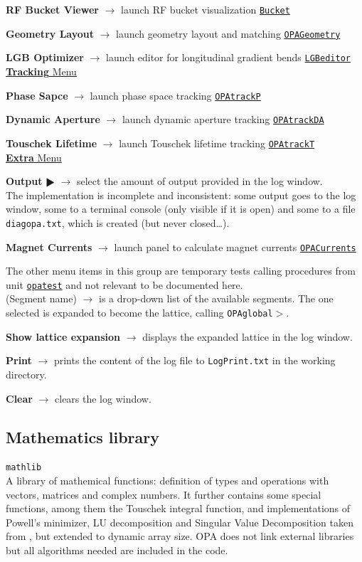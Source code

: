\documentclass[12pt]{article}
\newcommand\code[1]{{\tt #1}}
\newcommand{\ofld}[1]{\colorbox{black!15}{{\bf #1}}}
\newcommand{\ofldx}[1]{\colorbox{black!15}{(#1)}}
\newcommand\guico[1]{{\color{blue}\code{#1}}}
\newcommand{\unico}[1]{{\color{burntorange}\code{#1}}}
\newcommand{\evcod}[2]{\ofld{#1} $\rightarrow$ \guico{#2}}
\newcommand{\evcodx}[2]{\ofldx{#1} $\rightarrow$ \guico{#2}}
\newcommand{\prcod}[2]{\opauni{#1}$>$\unico{#2}}
\newcommand{\opagui}[1]{\colorbox{blue!20}{\code{#1}}}
\newcommand{\ogui}[1]{\hyperref[#1]{\opagui{#1}}}
\newcommand{\opauni}[1]{\colorbox{orange!30}{\code{#1}}}
\newcommand{\ounih}[2]{\subsection{\label{#2}#1}{\Huge\opauni{#2}}\\}
\newcommand{\ouni}[1]{\hyperref[#1]{\opauni{#1}}}
\newcommand{\desc}[1]{#1}
\newcommand{\todo}[1]{{\color{red} #1}}
\begin{document}
{\evcod{RF Bucket Viewer}{ds\_rfbu} launch RF bucket visualization \ogui{Bucket}

\evcod{Geometry Layout}{ds\_geo } launch geometry layout and matching \ogui{OPAGeometry}

\evcod{LGB Optimizer}{ds\_lgbo } launch editor for longitudinal gradient bends \ogui{LGBeditor}\\


\underline{\ofld{Tracking} Menu}

\evcod{Phase Sapce}{tr\_phsp} launch phase space tracking \ogui{OPAtrackP}

\evcod{Dynamic Aperture}{tr\_dyna} launch dynamic aperture tracking \ogui{OPAtrackDA}

\evcod{Touschek Lifetime}{tr\_ttau} launch Touschek lifetime tracking \ogui{OPAtrackT}\\

\underline{\ofld{Extra} Menu}

\evcod{Output $\RHD$}{tm\_di} select the amount of output provided in the log window.\\ \todo{The implementation is incomplete and inconsistent: some output goes to the log window, some to a terminal console (only visible if it is open) and some to a file \code{diagopa.txt}, which is created (but never closed\dots).}

\evcod{Magnet Currents}{tm\_cur} launch panel to calculate magnet currents \ogui{OPACurrents}

The other menu items in this group are temporary tests calling procedures from unit \ouni{opatest} and not relevant to be documented here.\\

\evcodx{Segment name}{ComboSeg} is a drop-down list of the available segments. The one selected is expanded to become the lattice, calling \prcod{OPAglobal}{MakeLattice}.

\evcod{Show lattice expansion}{butlatsh} displays the expanded lattice in the log window.

\evcod{Print}{ButLogPrt} prints the content of the log file to \code{LogPrint.txt} in the working directory.

\evcod{Clear}{ButLogClr} clears the log window.
}


\ounih{Mathematics library}{mathlib}

\desc{
A library of mathemical functions: definition of types and operations with vectors, matrices and complex numbers. It further contains some special functions, among them the Touschek integral function, and implementations of Powell's minimizer, LU decomposition and Singular Value Decomposition taken from \cite{numrec}, but extended to dynamic array size. OPA does not link external libraries but all algorithms needed are included in the code.}
\end{document}
